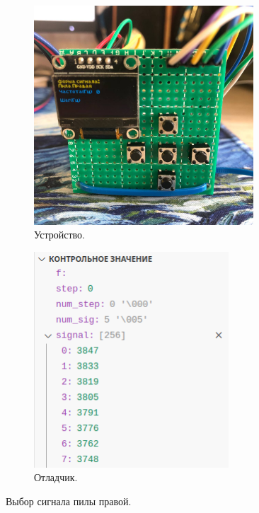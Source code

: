 	\begin{figure}[H]
     \begin{subfigure}[H]{0.5\textwidth}
         \centering
         \includegraphics[width=0.9\textwidth]{../image/test5_u_s.jpg}
         \caption{Устройство.}
     \end{subfigure}
     \hfill
     \begin{subfigure}[H]{0.5\textwidth}
         \centering
         \includegraphics[width=0.8\textwidth]{../image/test5_o_s.png}
         \caption{Отладчик.}
     \end{subfigure}
        \caption{Выбор сигнала пилы правой.}
	\end{figure}
	
